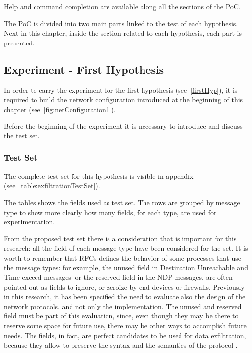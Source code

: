 \documentclass[12pt]{article}
\begin{document}
Help and command completion are available along all the sections of the PoC.

The PoC is divided into two main parts linked to the test of each hypothesis. Next in this chapter, inside the section related to each hypothesis, each part is presented.


\subsection{Experiment - First Hypothesis}
\label{sub:firstHypExp}

In order to carry the experiment for the first hypothesis (see~\ref{firstHyp}), it is required to build the network configuration introduced at the beginning of this chapter (see~\ref{fig:netConfiguration1}).

Before the beginning of the experiment it is necessary to introduce and discuss the test set.

\subsubsection{Test Set}
\label{subsub:testSet1}

The complete test set for this hypothesis is visible in appendix (see~\ref{table:exfiltrationTestSet}).

The tables shows the fields used as test set. The rows are grouped by message type to show more clearly how many fields, for each type, are used for experimentation.

From the proposed test set there is a consideration that is important for this research: all the field of each message type have been considered for the set. It is worth to remember that RFCs defines the behavior of some processes that use the message types: for example, the unused field in Destination Unreachable and Time exceed messages, or the reserved field in the NDP messages, are often pointed out as fields to ignore, or zeroize by end devices or firewalls. Previously in this research, it has been specified the need to evaluate also the design of the network protocols, and not only the implementation. The unused and reserved field must be part of this evaluation, since, even though they may be there to reserve some space for future use, there may be other ways to accomplish future needs. The fields, in fact, are perfect candidates to be used for data exfiltration, because they allow to preserve the syntax and the semantics of the protocol \cite{lewandowski}.
\end{document}
